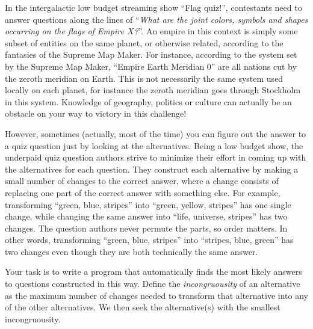 

In the intergalactic low budget streaming show ``Flag quiz!'', contestants need to answer questions along the lines of ``\emph{What are the joint colors, symbols and shapes occurring on the flags of Empire $X$?}''. An empire in this context is simply some subset of entities on the same planet, or otherwise related, according to the fantasies of the Supreme Map Maker. For instance, according to the system set by the Supreme Map Maker, ``Empire Earth Meridian 0'' are all nations cut by the zeroth meridian on Earth. This is not necessarily the same system used locally on each planet, for instance the zeroth meridian goes through Stockholm in this system. Knowledge of geography, politics or culture can actually be an obstacle on your way to victory in this challenge! 

However, sometimes (actually, most of the time) you can figure out the answer to a quiz question just by looking at the alternatives.  Being a low budget show, the underpaid quiz question authors strive to minimize their effort in coming up with the alternatives for each question.  They construct each alternative by making a small number of changes to the correct answer, where a change consists of replacing one part of the correct answer with something else. For example, transforming ``green, blue, stripes'' into ``green, yellow, stripes'' has one single change, while changing the same answer into ``life, universe, stripes'' has two changes.  The question authors never permute the parts, so order matters.  In other words, transforming ``green, blue, stripes'' into ``stripes, blue, green'' has two changes even though they are both technically the same answer.

Your task is to write a program that automatically finds the most likely answers to questions constructed in this way.  Define the \emph{incongruousity} of an alternative as the maximum number of changes needed to transform that alternative into any of the other alternatives.  We then seek the alternative(s) with the smallest incongruousity.

